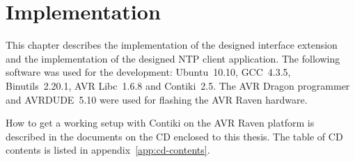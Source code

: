 
\chapter{Implementation}
This chapter describes the implementation of the designed interface extension %
and the implementation of the designed NTP client application.
The following software was used for the development:
Ubuntu~10.10, GCC~4.3.5, Binutils~2.20.1, AVR Libc~1.6.8 and Contiki~2.5.
The AVR Dragon programmer and AVRDUDE~5.10
were used for flashing the AVR Raven hardware.

How to get a working setup with Contiki on the AVR Raven platform is described in
the documents on the CD enclosed to this thesis.
The table of CD contents is listed in appendix~\ref{app:cd-contents}.








